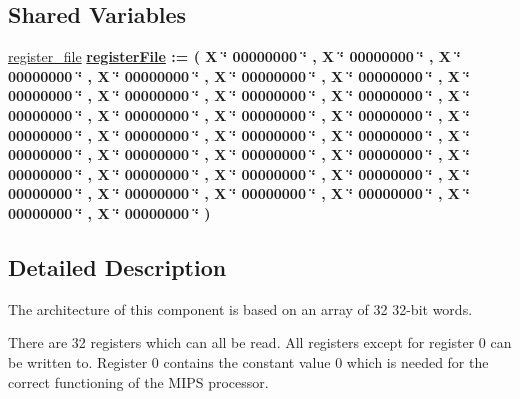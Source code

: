\subsection*{\-Shared \-Variables}
 \begin{DoxyCompactItemize}
\item 
\hyperlink{classregister__file_1_1behavioral_ab8a5b65dc9034963fa0d029a5d7c5534}{register\-\_\-file} {\bfseries {\bfseries \hyperlink{classregister__file_1_1behavioral_a312e330e12c981e3094d8419afb16a58}{register\-File}}   \-:=  (  \-X \char`\"{} 00000000 \char`\"{} ,  \-X \char`\"{} 00000000 \char`\"{} ,  \-X \char`\"{} 00000000 \char`\"{} ,  \-X \char`\"{} 00000000 \char`\"{} ,  \-X \char`\"{} 00000000 \char`\"{} ,  \-X \char`\"{} 00000000 \char`\"{} ,  \-X \char`\"{} 00000000 \char`\"{} ,  \-X \char`\"{} 00000000 \char`\"{} ,  \-X \char`\"{} 00000000 \char`\"{} ,  \-X \char`\"{} 00000000 \char`\"{} ,  \-X \char`\"{} 00000000 \char`\"{} ,  \-X \char`\"{} 00000000 \char`\"{} ,  \-X \char`\"{} 00000000 \char`\"{} ,  \-X \char`\"{} 00000000 \char`\"{} ,  \-X \char`\"{} 00000000 \char`\"{} ,  \-X \char`\"{} 00000000 \char`\"{} ,  \-X \char`\"{} 00000000 \char`\"{} ,  \-X \char`\"{} 00000000 \char`\"{} ,  \-X \char`\"{} 00000000 \char`\"{} ,  \-X \char`\"{} 00000000 \char`\"{} ,  \-X \char`\"{} 00000000 \char`\"{} ,  \-X \char`\"{} 00000000 \char`\"{} ,  \-X \char`\"{} 00000000 \char`\"{} ,  \-X \char`\"{} 00000000 \char`\"{} ,  \-X \char`\"{} 00000000 \char`\"{} ,  \-X \char`\"{} 00000000 \char`\"{} ,  \-X \char`\"{} 00000000 \char`\"{} ,  \-X \char`\"{} 00000000 \char`\"{} ,  \-X \char`\"{} 00000000 \char`\"{} ,  \-X \char`\"{} 00000000 \char`\"{} ,  \-X \char`\"{} 00000000 \char`\"{} ,  \-X \char`\"{} 00000000 \char`\"{}  ) } 
\end{DoxyCompactItemize}


\subsection{\-Detailed \-Description}
\-The architecture of this component is based on an array of 32 32-\/bit words. 

\-There are 32 registers which can all be read. \-All registers except for register 0 can be written to. \-Register 0 contains the constant value 0 which is needed for the correct functioning of the \-M\-I\-P\-S processor. 

